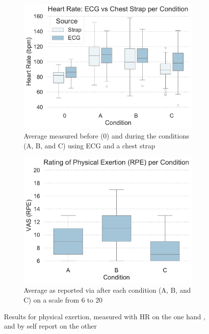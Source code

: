 \begin{figure}[htb]
	\centering
	\begin{subfigure}[t]{0.49\columnwidth}
		\centering
		\includegraphics[width=\textwidth]{include/images/hr_per_condition_by_source.pdf}
		\caption{Average  measured before (0) and during the conditions (A, B, and C) using \gls{ECG} and a chest strap}
		\label{fig:physical-exertion-hr}
	\end{subfigure}
	\hspace*{\fill}
	\begin{subfigure}[t]{0.49\columnwidth}
		\centering
		\includegraphics[width=\textwidth]{include/images/rpe_per_condition.pdf}
		\caption{Average  as reported via  after each condition (A, B, and C) on a scale from 6 to 20}
		\label{fig:physical-exertion-rpe}
	\end{subfigure}
	\captionsetup{subrefformat=parens}
	\caption[Results: physical exertion]{Results for physical exertion, measured with \gls{HR} on the one hand , and by self report  on the other}
	\label{fig:physical-exertion}
\end{figure}